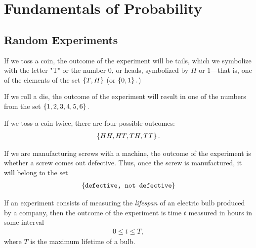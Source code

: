
\section{Fundamentals of Probability}

\subsection{Random Experiments}

\begin{example}
	\label{exmp:2.2.1}
	If we toss a coin, the outcome of the experiment will be tails, which we symbolize with the letter "T" or the number $0$, or heads, symbolized by $H$ or $1$—that is, one of the elements of the set $\left\{ T,H \right\}$ (or $\left\{ 0,1 \right\}.$)
\end{example}
\begin{example}
	\label{exmp:2.2.2}
	If we roll a die, the outcome of the experiment will result in one of the numbers from the set $\left\{ 1,2,3,4,5,6 \right\}.$
\end{example}



\begin{example}
	\label{exmp:2.2.3}
	If we toss a coin twice, there are four possible outcomes:
	\begin{align}
		\left\{ HH,HT,TH,TT \right\}.
	\end{align}
	
\end{example}



\begin{example}
	\label{exmp:2.2.4}
	If we are manufacturing screws with a machine, the outcome of the experiment is whether a screw comes out defective. Thus, once the screw is manufactured, it will belong to the set
	\begin{align}
		\left\{ \texttt{defective, not defective} \right\}
	\end{align}
	
\end{example}



\begin{example}
	\label{exmp:2.2.5}
	If an experiment consists of measuring the \emph{lifespan} of an electric bulb produced by a company, then the outcome of the experiment is time $t$ measured in hours in some interval
	\begin{align}
		0\leq t \leq T,
	\end{align}
	where $T$ is the maximum lifetime of a bulb.
\end{example}



